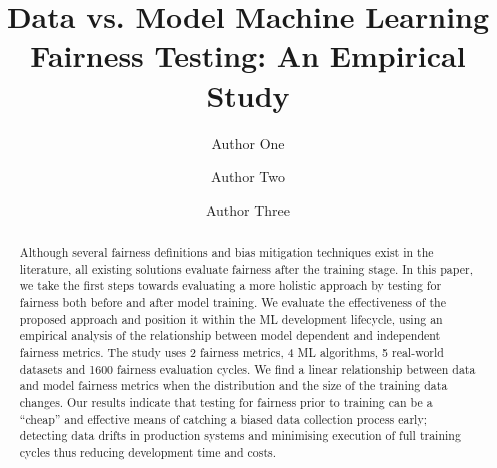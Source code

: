 \documentclass[sigconf,review]{acmart}
\begin{document}
\title{Data vs. Model Machine Learning Fairness Testing: An Empirical Study}

\author{Author One}

\author{Author Two}

\author{Author Three}




\begin{abstract}

Although several fairness definitions and bias mitigation techniques
exist in the literature, all existing solutions evaluate fairness
after the training stage. In this paper, we take the first steps
towards evaluating a more holistic approach by testing for fairness
both before and after model training. We evaluate the effectiveness
of the proposed approach and position it within the ML development
lifecycle, using an empirical analysis of the relationship between
model dependent and independent fairness metrics. The study uses 2
fairness metrics, 4 ML algorithms, 5 real-world datasets and
1600 fairness evaluation cycles. We find a linear relationship
between data and model fairness metrics when the distribution and
the size of the training data changes. Our results indicate that
testing for fairness prior to training can be a ``cheap'' and
effective means of catching a biased data collection process early;
detecting data drifts in production systems and minimising execution
of full training cycles thus reducing development time and costs.

\end{abstract}

\maketitle
\end{document}
